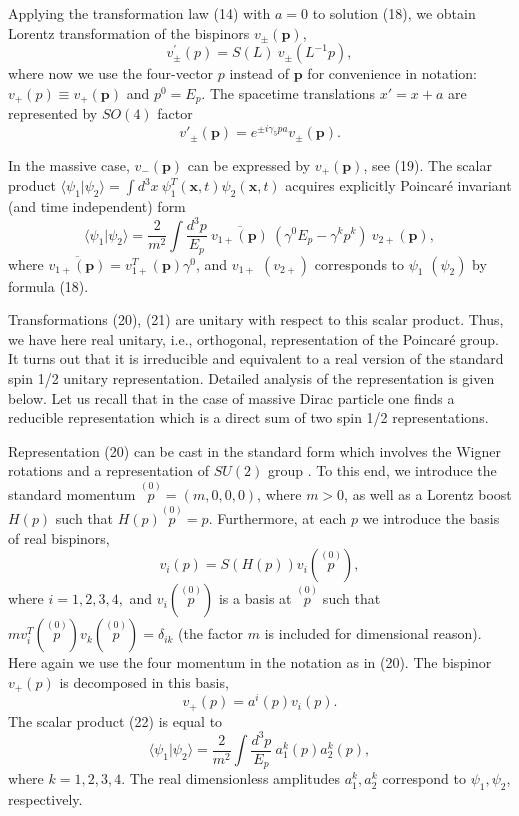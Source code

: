\documentclass[12pt]{article}
\begin{document}
Applying the transformation law (14) with $a=0$  to  solution  (18), we obtain  Lorentz transformation of the bispinors $ v_{\pm}(\mathbf{p})$,    
\begin{equation}
v_{\pm}^{'}(p) =   S(L) \:v_{\pm}(L^{-1}p),
\end{equation}
where now we use the four-vector $p$ instead of $\mathbf{p}$  for  convenience in notation:   $v_+(p) \equiv v_+(\mathbf{p})$  and $p^0 =E_p$.  
The spacetime  translations $x'  = x + a  $  are represented by $SO(4)$    factor 
\begin{equation}  v'_{\pm}(\mathbf{p}) = e^{\pm i \gamma_5  p a}   v_{\pm}(\mathbf{p}). \end{equation}


 In the massive  case,  $v_-(\mathbf{p}) $  can be expressed by $v_+(\mathbf{p})$, see (19). The scalar product $\langle\psi_1|\psi_2\rangle = \int \!d^3x\:\psi_1^T(\mathbf{x},t) \psi_2(\mathbf{x}, t) $ acquires  explicitly Poincar\'e  invariant (and time independent) form 
\begin{equation} \langle \psi_1 | \psi_2 \rangle = \frac{2}{m^2}  \int\!\frac{d^3p}{E_p}\: \overline{v_{1+}(\mathbf{p})}\: ( \gamma^0 E_p - \gamma^k p^k)\: v_{2+}(\mathbf{p}),\end{equation} 
where $\overline{v_{1+}(\mathbf{p})} = v_{1+}^T(\mathbf{p}) \gamma^0$,  and $v_{1+}$ $(v_{2+}) $ corresponds to $\psi_1$ $(\psi_2)$ by formula (18). 
 
Transformations  (20), (21)  are unitary with respect to this scalar product. Thus, we have here  real unitary, i.e., orthogonal,  representation of the Poincar\'e  group.  It  turns out that it is irreducible and equivalent to a real version of the standard spin 1/2 unitary representation.  Detailed analysis 
of the representation is given  below.   Let us recall that   in the case of  massive Dirac particle  one finds a reducible representation which is  a direct sum of   two  spin 1/2 representations. 

Representation (20) can be cast in the standard  form which involves the Wigner rotations and a representation of  $SU(2)$ group \cite{15}.
To this end,  we introduce the standard momentum $\stackrel{(0)}{p} = (m, 0,0,0)$, where $m >0$,  as well as a Lorentz boost $H(p)$ such that  $H(p) \stackrel{(0)}{p} = p$.  Furthermore, at each $p$ we introduce the basis  of real bispinors,
\begin{equation} v_i(p) = S(H(p)) v_i(\stackrel{(0)}{p}),\end{equation} 
  where $i = 1, 2, 3, 4,$ and $ v_i(\stackrel{(0)}{p})$ is a basis at $ \stackrel{(0)}{p}$ such that  $m v^T_i(\stackrel{(0)}{p})  v_k(\stackrel{(0)}{p}) = \delta_{ik}$ (the factor $m$ is included for dimensional reason). 
Here again we use the four momentum in the  notation as in (20).  The bispinor $v_+(p)$  
is decomposed in this basis,  \[v_+(p) = a^i(p) v_i(p).\]  The scalar product (22)  is equal to \begin{equation}  \langle \psi_1| \psi_2 \rangle = \frac{2}{m^2} \int \! \frac{d^3 p}{E_p} \: a_1^k(p) a_2^k(p), \end{equation}
where  $k= 1,2,3,4$.  The real dimensionless amplitudes $a^k_1, a^k_2$  correspond to $\psi_1, \psi_2$, respectively. 
\end{document}

